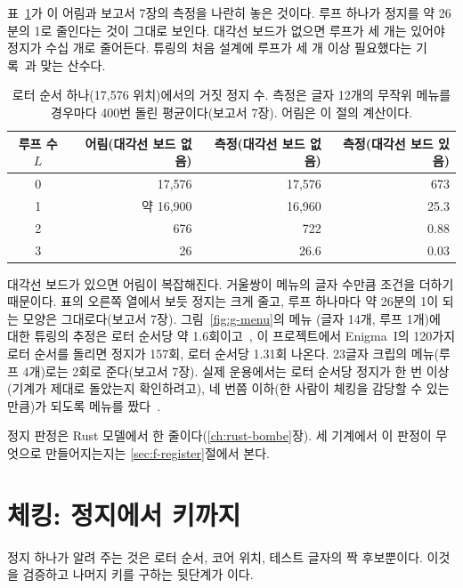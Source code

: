 표~\ref{tab:ac-estimate}가 이 어림과 보고서 7장의 측정을 나란히 놓은 것이다. 루프 하나가 정지를 약 26분의 1로
줄인다는 것이 그대로 보인다. 대각선 보드가 없으면 루프가 세 개는 있어야 정지가 수십 개로 줄어든다. 튜링의 처음
설계에 루프가 세 개 이상 필요했다는 기록~\cite{carter2010bombe}과 맞는 산수다.

\begin{table}[ht]
\centering
\caption{로터 순서 하나(17,576 위치)에서의 거짓 정지 수. 측정은 글자 12개의 무작위 메뉴를 경우마다 400번 돌린
평균이다(보고서 7장). 어림은 이 절의 계산이다.}
\label{tab:ac-estimate}
\small
\begin{tabular}{c r r r}
\toprule
루프 수 $L$ & 어림(대각선 보드 없음) & 측정(대각선 보드 없음) & 측정(대각선 보드 있음) \\
\midrule
0 & 17,576 & 17,576 & 673 \\
1 & 약 16,900 & 16,960 & 25.3 \\
2 & 676 & 722 & 0.88 \\
3 & 26 & 26.6 & 0.03 \\
\bottomrule
\end{tabular}
\end{table}

대각선 보드가 있으면 어림이 복잡해진다. 거울쌍이 메뉴의 글자 수만큼 조건을 더하기 때문이다. 표의 오른쪽 열에서 보듯
정지는 크게 줄고, 루프 하나마다 약 26분의 1이 되는 모양은 그대로다(보고서 7장). 그림~\ref{fig:g-menu}의 메뉴
(글자 14개, 루프 1개)에 대한 튜링의 추정은 로터 순서당 약 1.6회이고~\cite{carter-stops,wikipedia-bombe}, 이
프로젝트에서 Enigma~I의 120가지 로터 순서를 돌리면 정지가 157회, 로터 순서당 1.31회 나온다. 23글자 크립의 메뉴(루프
4개)로는 2회로 준다(보고서 7장). 실제 운용에서는 로터 순서당 정지가 한 번 이상(기계가 제대로 돌았는지 확인하려고),
네 번쯤 이하(한 사람이 체킹을 감당할 수 있는 만큼)가 되도록 메뉴를 짰다~\cite[31, 44, 49]{us6812report1944}.

\Ours 정지 판정은 Rust 모델에서  한 줄이다(\ref{ch:rust-bombe}장). 세 기계에서 이 판정이
무엇으로 만들어지는지는 \ref{sec:f-register}절에서 본다.

\section{체킹: 정지에서 키까지}\label{sec:ac-check}

정지 하나가 알려 주는 것은 로터 순서, 코어 위치, 테스트 글자의 짝 후보뿐이다. 이것을 검증하고 나머지 키를 구하는
뒷단계가 이다.

